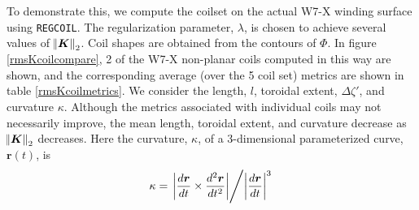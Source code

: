 \documentclass[aps,unsortedaddress]{revtex4-1}
\newcommand{\der}[2]{\dfrac{d #1}{d  #2}}
\begin{document}
To demonstrate this, we compute the coilset on the actual W7-X winding surface using \texttt{REGCOIL}. The regularization parameter, $\lambda$, is chosen to achieve several values of $\norm{\bm{K}}_2$. Coil shapes are obtained from the contours of $\Phi$. In figure \ref{rmsKcoilcompare}, 2 of the W7-X non-planar coils computed in this way are shown, and the corresponding average (over the 5 coil set) metrics are shown in table \ref{rmsKcoilmetrics}. We consider the length, $l$, toroidal extent, $\Delta \zeta'$, and curvature $\kappa$. Although the metrics associated with individual coils may not necessarily improve, the mean length, toroidal extent, and curvature decrease as $\norm{\bm{K}}_2$ decreases. Here the curvature, $\kappa$, of a 3-dimensional parameterized curve, $\bm{r}(t)$, is
\begin{gather}
\kappa = \left. \bigg \rvert \der{\bm{r}}{t} \times \der{^2 \bm{r}}{t^2} \bigg \rvert \middle/ \bigg \rvert \der{\bm{r}}{t} \bigg \rvert^3 \right.
\end{gather}
\end{document}
